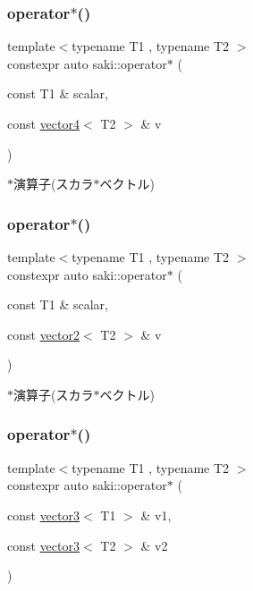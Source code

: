 \subsubsection{\texorpdfstring{operator$\ast$()}{operator*()}\hspace{0.1cm}{\footnotesize\ttfamily [7/14]}}
{\footnotesize\ttfamily template$<$typename T1 , typename T2 $>$ \\
constexpr auto saki\+::operator$\ast$ (\begin{DoxyParamCaption}\item[{const T1 \&}]{scalar,  }\item[{const \mbox{\hyperlink{classsaki_1_1vector4}{vector4}}$<$ T2 $>$ \&}]{v }\end{DoxyParamCaption})}



$\ast$演算子(スカラ$\ast$ベクトル) 

\mbox{\label{namespacesaki_a7d5d04727e813b089aadf4b97247b64a}} 
\subsubsection{\texorpdfstring{operator$\ast$()}{operator*()}\hspace{0.1cm}{\footnotesize\ttfamily [8/14]}}
{\footnotesize\ttfamily template$<$typename T1 , typename T2 $>$ \\
constexpr auto saki\+::operator$\ast$ (\begin{DoxyParamCaption}\item[{const T1 \&}]{scalar,  }\item[{const \mbox{\hyperlink{classsaki_1_1vector2}{vector2}}$<$ T2 $>$ \&}]{v }\end{DoxyParamCaption})}



$\ast$演算子(スカラ$\ast$ベクトル) 

\mbox{\label{namespacesaki_a59d261ceb3780fa55acc164671b67992}} 
\subsubsection{\texorpdfstring{operator$\ast$()}{operator*()}\hspace{0.1cm}{\footnotesize\ttfamily [9/14]}}
{\footnotesize\ttfamily template$<$typename T1 , typename T2 $>$ \\
constexpr auto saki\+::operator$\ast$ (\begin{DoxyParamCaption}\item[{const \mbox{\hyperlink{classsaki_1_1vector3}{vector3}}$<$ T1 $>$ \&}]{v1,  }\item[{const \mbox{\hyperlink{classsaki_1_1vector3}{vector3}}$<$ T2 $>$ \&}]{v2 }\end{DoxyParamCaption})}



